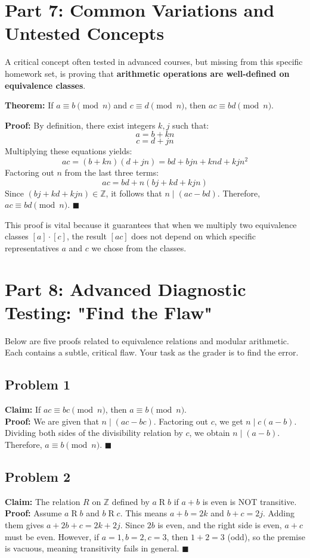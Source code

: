 \documentclass[11pt, a4paper]{article}
\theoremstyle{definition}
\theoremstyle{remark}
\begin{document}
\section{Part 7: Common Variations and Untested Concepts}

A critical concept often tested in advanced courses, but missing from this specific homework set, is proving that \textbf{arithmetic operations are well-defined on equivalence classes}. 

\textbf{Theorem:} If $a \equiv b \pmod{n}$ and $c \equiv d \pmod{n}$, then $ac \equiv bd \pmod{n}$.

\textbf{Proof:}
By definition, there exist integers $k, j$ such that:
\[ \displaystyle a = b + kn \]
\[ \displaystyle c = d + jn \]
Multiplying these equations yields:
\[ \displaystyle ac = (b + kn)(d + jn) = bd + bjn + knd + kjn^2 \]
Factoring out $n$ from the last three terms:
\[ \displaystyle ac = bd + n(bj + kd + kjn) \]
Since $(bj + kd + kjn) \in \mathbb{Z}$, it follows that $n \mid (ac - bd)$. Therefore, $ac \equiv bd \pmod{n}$. $\blacksquare$

This proof is vital because it guarantees that when we multiply two equivalence classes $[a] \cdot [c]$, the result $[ac]$ does not depend on which specific representatives $a$ and $c$ we chose from the classes.

\newpage
\section{Part 8: Advanced Diagnostic Testing: "Find the Flaw"}

Below are five proofs related to equivalence relations and modular arithmetic. Each contains a subtle, critical flaw. Your task as the grader is to find the error.

\subsection*{Problem 1}
\textbf{Claim:} If $ac \equiv bc \pmod{n}$, then $a \equiv b \pmod{n}$. \\
\textbf{Proof:} We are given that $n \mid (ac - bc)$. Factoring out $c$, we get $n \mid c(a - b)$. Dividing both sides of the divisibility relation by $c$, we obtain $n \mid (a - b)$. Therefore, $a \equiv b \pmod{n}$. $\blacksquare$

\subsection*{Problem 2}
\textbf{Claim:} The relation $R$ on $\mathbb{Z}$ defined by $a \mathrel{R} b$ if $a + b$ is even is NOT transitive. \\
\textbf{Proof:} Assume $a \mathrel{R} b$ and $b \mathrel{R} c$. This means $a + b = 2k$ and $b + c = 2j$. Adding them gives $a + 2b + c = 2k + 2j$. Since $2b$ is even, and the right side is even, $a + c$ must be even. However, if $a=1, b=2, c=3$, then $1+2=3$ (odd), so the premise is vacuous, meaning transitivity fails in general. $\blacksquare$
\end{document}
